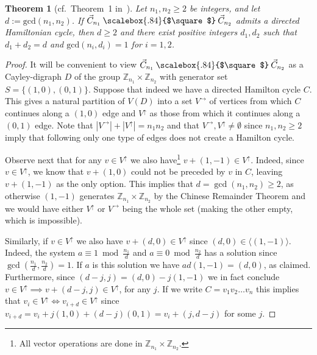 \documentclass[english,11pt]{article}
\newtheorem{theorem}{Theorem}[section]
\theoremstyle{definition}
\numberwithin{equation}{section}
\numberwithin{figure}{section}
\newcommand\car{\mathbin{\text{\scalebox{.84}{$\square$}}}}
\begin{document}
\begin{theorem}[cf.~Theorem~1 in~\cite{TrotterErdos}]\label{thm:trottererdos}
Let $n_1, n_2\ge2$ be integers, and let $d:=\mathrm{gcd}(n_1,n_2)$. If $\vec{C}_{n_1}\car \vec{C}_{n_2}$ admits a directed Hamiltonian cycle, then $d \ge 2$ and there exist positive integers $d_1, d_2$ such that $d_1+d_2=d$ and $\mathrm{gcd}(n_i,d_i)=1$ for $i=1,2$. 
\end{theorem}

\begin{proof}
    It will be convenient to view $\vec{C}_{n_1}\car \vec{C}_{n_2}$ as a Cayley-digraph $D$ of the group $\mathbb{Z}_{n_1}\times \mathbb{Z}_{n_2}$ with generator set $S=\{(1,0),(0,1)\}$. Suppose that indeed we have a directed Hamilton cycle $C$. This gives a natural partition of $V(D)$ into a set $V^{\rightarrow}$ of vertices from which $C$ continues along a $(1,0)$ edge and $V^{\uparrow}$ as those from which it continues along a $(0,1)$ edge. Note that $|V^{\rightarrow}|+|V^{\uparrow}|=n_1n_2$ and that $V^{\rightarrow},V^{\uparrow} \neq \emptyset$ since $n_1,n_2 \ge 2$ imply that following only one type of edges does not create a Hamilton cycle.

    Observe next that for any $v \in V^{\uparrow}$ we also have\footnote{All vector operations are done in $\mathbb{Z}_{n_1}\times \mathbb{Z}_{n_2}$.} $v+(1,-1) \in V^{\uparrow}$. Indeed, since $v \in V^{\uparrow}$, we know that $v+(1,0)$ could not be preceded by $v$ in $C$, leaving $v+(1,-1)$ as the only option. This implies that $d=\gcd(n_1,n_2) \ge 2$, as otherwise $(1,-1)$ generates $\mathbb{Z}_{n_1}\times \mathbb{Z}_{n_2}$ by the Chinese Remainder Theorem and we would have either $V^{\uparrow}$ or $V^{\rightarrow}$ being the whole set (making the other empty, which is impossible).

    Similarly, if $v \in V^{\uparrow}$ we also have $v+(d,0) \in V^{\uparrow}$ since $(d,0) \in \langle (1, -1) \rangle$. Indeed, the system $a \equiv 1 \bmod {\frac{n_1}{d}}$ and $a \equiv 0 \bmod {\frac{n_2}{d}}$ has a solution since $\gcd(\frac{n_1}{d},\frac{n_2}{d})=1$. If $a$ is this solution we have $ad(1,-1)=(d,0)$, as claimed. Furthermore, since $(d-j,j)=(d,0)-j(1,-1)$ we in fact conclude $v \in V^{\uparrow} \implies v+(d-j,j) \in V^{\uparrow}$, for any $j$. If we write $C=v_1v_2\ldots v_n$ this implies that $v_i \in V^{\uparrow} \Leftrightarrow v_{i+d}\in V^{\uparrow}$ since $v_{i+d}=v_i+j(1,0)+(d-j)(0,1)= v_i+(j,d-j)$ for some $j$. 
    

\end{proof}
\end{document}
